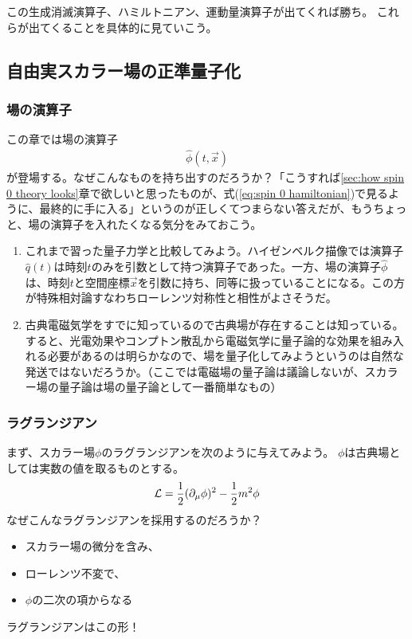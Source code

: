 \documentclass[10pt,a4paper]{jarticle}
\begin{document}
この生成消滅演算子、ハミルトニアン、運動量演算子が出てくれば勝ち。
これらが出てくることを具体的に見ていこう。


\subsection{自由実スカラー場の正準量子化}

\subsubsection{場の演算子}
この章では場の演算子
\begin{align}
\hat\phi(t,\vec x)
\end{align}
が登場する。なぜこんなものを持ち出すのだろうか？「こうすれば\ref{sec:how spin 0 theory looks}章で欲しいと思ったものが、式(\ref{eq:spin 0 hamiltonian})で見るように、最終的に手に入る」というのが正しくてつまらない答えだが、もうちょっと、場の演算子を入れたくなる気分をみておこう。

\begin{enumerate}
\item これまで習った量子力学と比較してみよう。ハイゼンベルク描像では演算子$\hat q(t)$は時刻$t$のみを引数として持つ演算子であった。一方、場の演算子$\hat\phi$は、時刻$t$と空間座標$\vec x$を引数に持ち、同等に扱っていることになる。この方が特殊相対論すなわちローレンツ対称性と相性がよさそうだ。
\item 古典電磁気学をすでに知っているので古典場が存在することは知っている。すると、光電効果やコンプトン散乱から電磁気学に量子論的な効果を組み入れる必要があるのは明らかなので、場を量子化してみようというのは自然な発送ではないだろうか。（ここでは電磁場の量子論は議論しないが、スカラー場の量子論は場の量子論として一番簡単なもの）
\end{enumerate}



\subsubsection{ラグランジアン}
まず、スカラー場$\phi$のラグランジアンを次のように与えてみよう。
$\phi$は古典場としては実数の値を取るものとする。
\begin{align}
{\cal L} = \frac{1}{2}(\partial_\mu \phi)^2 - \frac{1}{2}m^2\phi
\end{align}
なぜこんなラグランジアンを採用するのだろうか？
\begin{itemize}
\item スカラー場の微分を含み、
\item ローレンツ不変で、
\item $\phi$の二次の項からなる
\end{itemize}
ラグランジアンはこの形！
\end{document}
